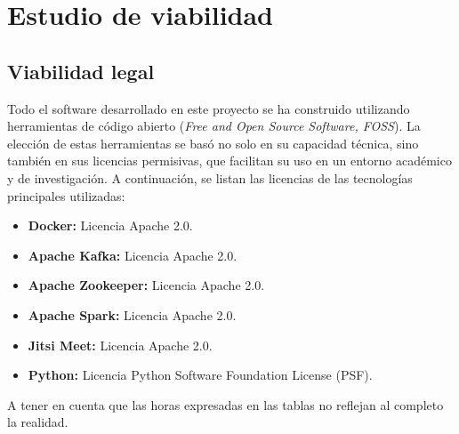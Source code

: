 \section{Estudio de viabilidad}
\label{sec:plan_viabilidad}

\subsection{Viabilidad legal}
\label{subsec:viabilidad_legal}
Todo el software desarrollado en este proyecto se ha construido utilizando herramientas de código abierto (\textit{Free and Open Source Software, FOSS}). La elección de estas herramientas se basó no solo en su capacidad técnica, sino también en sus licencias permisivas, que facilitan su uso en un entorno académico y de investigación. A continuación, se listan las licencias de las tecnologías principales utilizadas:

\begin{itemize}
    \item \textbf{Docker:} Licencia Apache 2.0.
    \item \textbf{Apache Kafka:} Licencia Apache 2.0.
    \item \textbf{Apache Zookeeper:} Licencia Apache 2.0.
    \item \textbf{Apache Spark:} Licencia Apache 2.0.
    \item \textbf{Jitsi Meet:} Licencia Apache 2.0.
    \item \textbf{Python:} Licencia Python Software Foundation License (PSF).
\end{itemize}

A tener en cuenta que las horas expresadas en las tablas no reflejan al completo la realidad.